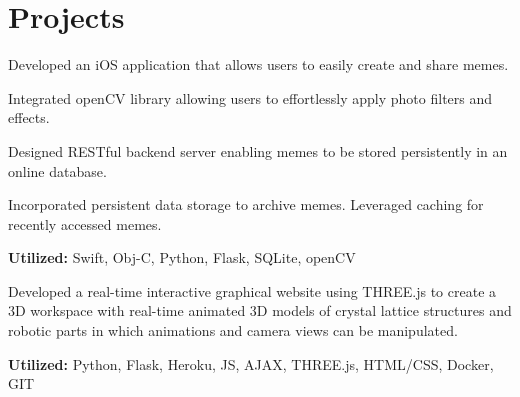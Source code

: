 \documentclass[a4paper]{deedy-resume-openfont} %
\begin{document}
\begin{minipage}[t]{0.60\textwidth}
\section{Projects}
\begin{tightemize}
\item Developed an iOS application that allows users to easily create and share memes.
\item Integrated openCV library allowing users to effortlessly apply photo filters and effects.
\item Designed RESTful backend server enabling memes to be stored persistently in an online database.
\item Incorporated persistent data storage to archive memes. Leveraged caching for recently accessed memes.
\item {\fontsize{10}{10}\selectfont\bfseries Utilized:} Swift, Obj-C, Python, Flask, SQLite, openCV
\end{tightemize}
\sectionsep

\begin{tightemize}
\item Developed a real-time interactive graphical website using THREE.js to create a 3D workspace with real-time animated 3D models of crystal lattice structures and robotic parts in which animations and camera views can be manipulated.
\item {\fontsize{10}{10}\selectfont\bfseries Utilized:} Python, Flask, Heroku, JS, AJAX, THREE.js, HTML/CSS, Docker, GIT
\end{tightemize}
\sectionsep

% 


\end{minipage}
\end{document}
